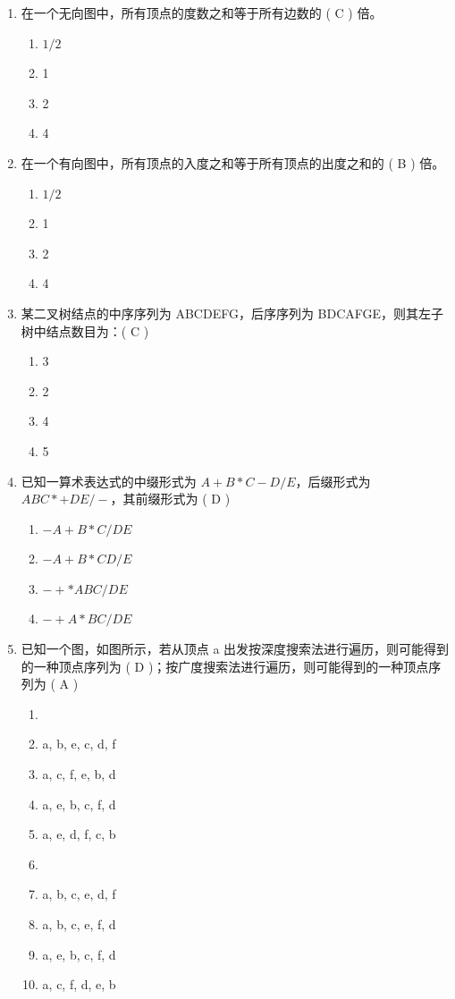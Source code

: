 \documentclass[12pt, a4paper]{article}
\begin{document}
\begin{enumerate}[label=\arabic*.]
    \item 在一个无向图中，所有顶点的度数之和等于所有边数的 ( C ) 倍。
    \begin{enumerate}
        \item $1/2$
        \item 1
        \item 2
        \item 4
    \end{enumerate}

    \item 在一个有向图中，所有顶点的入度之和等于所有顶点的出度之和的 ( B ) 倍。
    \begin{enumerate}
        \item $1/2$
        \item 1
        \item 2
        \item 4
    \end{enumerate}

    \item 某二叉树结点的中序序列为 ABCDEFG，后序序列为 BDCAFGE，则其左子树中结点数目为：( C )
    \begin{enumerate}
        \item 3
        \item 2
        \item 4
        \item 5
    \end{enumerate}

    \item 已知一算术表达式的中缀形式为 $A+B*C-D/E$，后缀形式为 $ABC*+DE/- $，其前缀形式为 ( D )
    \begin{enumerate}
        \item $-A+B*C/DE$
        \item $-A+B*CD/E$
        \item $-+*ABC/DE$
        \item $-+A*BC/DE$
    \end{enumerate}

    \item 已知一个图，如图所示，若从顶点 a 出发按深度搜索法进行遍历，则可能得到的一种顶点序列为 ( D )；按广度搜索法进行遍历，则可能得到的一种顶点序列为 ( A )
    \begin{enumerate}
        \item[(1)] 
        \item a, b, e, c, d, f
        \item a, c, f, e, b, d
        \item a, e, b, c, f, d
        \item a, e, d, f, c, b
        \item[(2)]
        \item a, b, c, e, d, f
        \item a, b, c, e, f, d
        \item a, e, b, c, f, d
        \item a, c, f, d, e, b
    \end{enumerate}


\end{enumerate}
\end{document}
